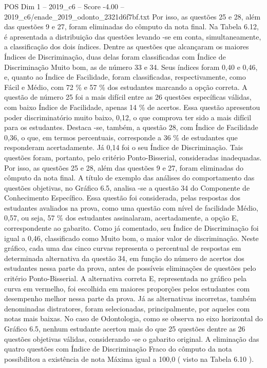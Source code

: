 \begin{textsample}{POS Dim 1 – 2019\_c6 – Score -4.00 – 2019\_c6/enade\_2019\_odonto\_2321d6f7bf.txt}
Por isso, as questões 25 e 28, além das questões 9 e 27, foram eliminadas do cômputo da nota final.
Na Tabela 6.12, é apresentada a distribuição das questões levando -se em conta, simultaneamente, a classificação dos dois índices.
Dentre as questões que alcançaram os maiores Índices de Discriminação, duas delas foram classificadas com Índice de Discriminação Muito bom, as de número 33 e 34.
Seus índices foram 0,40 e 0,46, e, quanto ao Índice de Facilidade, foram classificadas, respectivamente, como Fácil e Médio, com 72 \% e 57 \% dos estudantes marcando a opção correta.
A questão de número 25 foi a mais difícil entre as 26 questões específicas válidas, com baixo Índice de Facilidade, apenas 14 \% de acertos.
Essa questão apresentou poder discriminatório muito baixo, 0,12, o que comprova ter sido a mais difícil para os estudantes.
Destaca -se, também, a questão 28, com Índice de Facilidade 0,36, o que, em termos percentuais, corresponde a 36 \% de estudantes que responderam acertadamente.
Já 0,14 foi o seu Índice de Discriminação.
Tais questões foram, portanto, pelo critério Ponto-Bisserial, consideradas inadequadas.
Por isso, as questões 25 e 28, além das questões 9 e 27, foram eliminadas do cômputo da nota final.
A título de exemplo das análises do comportamento das questões objetivas, no Gráfico 6.5, analisa -se a questão 34 do Componente de Conhecimento Específico.
Essa questão foi considerada, pelas respostas dos estudantes avaliados na prova, como uma questão com nível de facilidade Médio, 0,57, ou seja, 57 \% dos estudantes assinalaram, acertadamente, a opção E, correspondente ao gabarito.
Como já comentado, seu Índice de Discriminação foi igual a 0,46, classificado como Muito bom, o maior valor de discriminação.
Neste gráfico, cada uma das cinco curvas representa o percentual de respostas em determinada alternativa da questão 34, em função do número de acertos dos estudantes nessa parte da prova, antes de possíveis eliminações de questões pelo critério Ponto-Bisserial.
A alternativa correta E, representada no gráfico pela curva em vermelho, foi escolhida em maiores proporções pelos estudantes com desempenho melhor nessa parte da prova.
Já as alternativas incorretas, também denominadas distratores, foram selecionadas, principalmente, por aqueles com notas mais baixas.
No caso de Odontologia, como se observa no eixo horizontal do Gráfico 6.5, nenhum estudante acertou mais do que 25 questões dentre as 26 questões objetivas válidas, considerando -se o gabarito original.
A eliminação das quatro questões com Índice de Discriminação Fraco do cômputo da nota possibilitou a existência de nota Máxima igual a 100,0 ( visto na Tabela 6.10 ).

\end{textsample}
